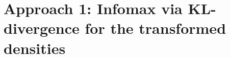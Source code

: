 \begin{frame}

\end{frame}

\clearpage

\section{Approach 1: Infomax via KL-divergence for the transformed densities}

